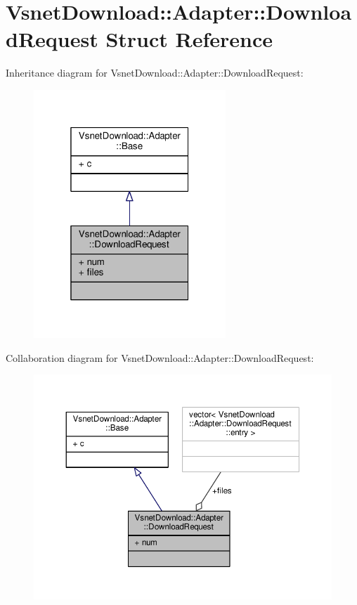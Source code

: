 \hypertarget{structVsnetDownload_1_1Adapter_1_1DownloadRequest}{}\section{Vsnet\+Download\+:\+:Adapter\+:\+:Download\+Request Struct Reference}
\label{structVsnetDownload_1_1Adapter_1_1DownloadRequest}


Inheritance diagram for Vsnet\+Download\+:\+:Adapter\+:\+:Download\+Request\+:
\nopagebreak
\begin{figure}[H]
\begin{center}
\leavevmode
\includegraphics[width=205pt]{de/d3c/structVsnetDownload_1_1Adapter_1_1DownloadRequest__inherit__graph}
\end{center}
\end{figure}


Collaboration diagram for Vsnet\+Download\+:\+:Adapter\+:\+:Download\+Request\+:
\nopagebreak
\begin{figure}[H]
\begin{center}
\leavevmode
\includegraphics[width=350pt]{d6/d61/structVsnetDownload_1_1Adapter_1_1DownloadRequest__coll__graph}
\end{center}
\end{figure}
